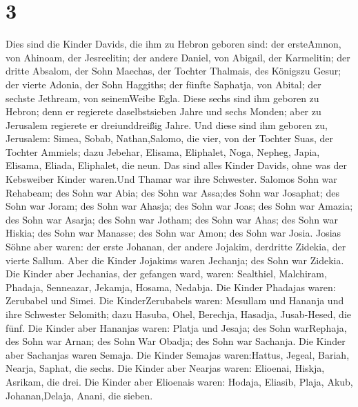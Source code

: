 \hypertarget{section-2}{%
\section{3}\label{section-2}}

 Dies sind die Kinder Davids, die ihm zu Hebron geboren
sind: der ersteAmnon, von Ahinoam, der Jesreelitin; der andere Daniel,
von Abigail, der Karmelitin;  der dritte Absalom, der Sohn
Maechas, der Tochter Thalmais, des Königszu Gesur; der vierte Adonia,
der Sohn Haggiths;  der fünfte Saphatja, von Abital; der
sechste Jethream, von seinemWeibe Egla.  Diese sechs sind
ihm geboren zu Hebron; denn er regierete daselbstsieben Jahre und sechs
Monden; aber zu Jerusalem regierete er dreiunddreißig Jahre.
 Und diese sind ihm geboren zu, Jerusalem: Simea, Sobab,
Nathan,Salomo, die vier, von der Tochter Suas, der Tochter Ammiels;
 dazu Jebehar, Elisama, Eliphalet,  Noga,
Nepheg, Japia,  Elisama, Eliada, Eliphalet, die neun.
 Das sind alles Kinder Davids, ohne was der Kebsweiber
Kinder waren.Und Thamar war ihre Schwester.  Salomos Sohn
war Rehabeam; des Sohn war Abia; des Sohn war Assa;des Sohn war
Josaphat;  des Sohn war Joram; des Sohn war Ahasja; des
Sohn war Joas;  des Sohn war Amazia; des Sohn war Asarja;
des Sohn war Jotham;  des Sohn war Ahas; des Sohn war
Hiskia; des Sohn war Manasse;  des Sohn war Amon; des Sohn
war Josia.  Josias Söhne aber waren: der erste Johanan, der
andere Jojakim, derdritte Zidekia, der vierte Sallum.  Aber
die Kinder Jojakims waren Jechanja; des Sohn war Zidekia. 
Die Kinder aber Jechanias, der gefangen ward, waren: Sealthiel,
 Malchiram, Phadaja, Senneazar, Jekamja, Hosama, Nedabja.
 Die Kinder Phadajas waren: Zerubabel und Simei. Die
KinderZerubabels waren: Mesullam und Hananja und ihre Schwester
Selomith;  dazu Hasuba, Ohel, Berechja, Hasadja,
Jusab-Hesed, die fünf.  Die Kinder aber Hananjas waren:
Platja und Jesaja; des Sohn warRephaja, des Sohn war Arnan; des Sohn War
Obadja; des Sohn war Sachanja.  Die Kinder aber Sachanjas
waren Semaja. Die Kinder Semajas waren:Hattus, Jegeal, Bariah, Nearja,
Saphat, die sechs.  Die Kinder aber Nearjas waren:
Elioenai, Hiskja, Asrikam, die drei.  Die Kinder aber
Elioenais waren: Hodaja, Eliasib, Plaja, Akub, Johanan,Delaja, Anani,
die sieben.

